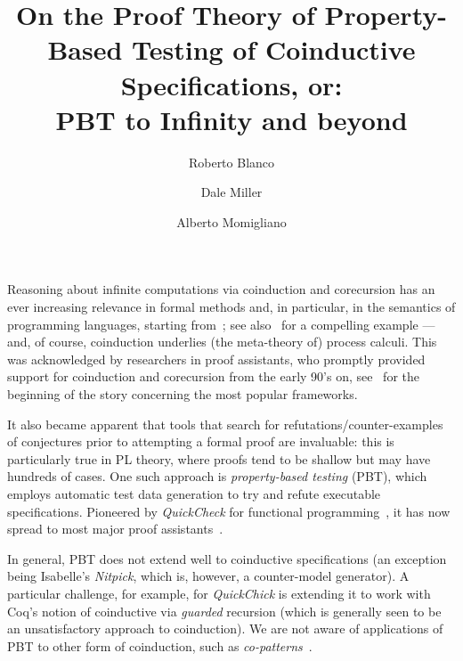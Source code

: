 \documentclass[a4paper]{easychair}
\title{On the Proof Theory of Property-Based Testing of Coinductive Specifications, or:\\
 PBT to Infinity and beyond}
\author{Roberto Blanco\inst{1} \and Dale Miller\inst{2} \and Alberto Momigliano\inst{3}}
\institute{
  INRIA Paris, France
  \and
  INRIA Saclay \& LIX, \'Ecole Polytechnique, France\\
\and
DI, Universit\`a degli Studi di Milano, Italy
}
\begin{document}
\maketitle

Reasoning about infinite computations via coinduction and corecursion
has an ever increasing relevance in formal methods and, in particular,
in the semantics of programming languages, starting
from~\cite{milner91tcs}; see also~\cite{2007-Leroy-Grall} for a
compelling example --- and, of course, coinduction underlies (the
meta-theory of) process calculi. This was acknowledged by researchers
in proof assistants, who promptly provided support for coinduction and
corecursion from the early 90's on, see~\cite{Paulson97,Gim95types}
for the beginning of the story concerning the most popular frameworks.

It also became apparent that tools that search for
refutations/counter-examples of conjectures prior to attempting a
formal proof are invaluable: this is particularly true in PL theory,
where proofs tend to be shallow but may have hundreds of cases.  One
such approach is \emph{property-based testing} (PBT), which employs
automatic test data generation to try and refute executable
specifications.  Pioneered by \emph{QuickCheck} for functional
programming~\cite{claessen00icfp}, it has now spread to most major
proof assistants~\cite{BlanchetteBN11,QChick}.


In general, PBT does not extend well to coinductive specifications
(an exception being Isabelle's \emph{Nitpick},
which is, however, a counter-model generator).  A particular
challenge, for example, for \emph{QuickChick} is extending it to work
with Coq's notion of coinductive via \emph{guarded} recursion (which
is generally seen to be an unsatisfactory approach to coinduction). We
are not aware of applications of PBT to other form of coinduction, such as \emph{co-patterns}~\cite{AbelPTS13}.
\end{document}
